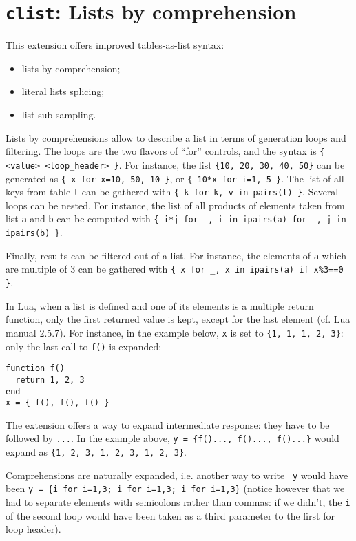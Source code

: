 \section{{\tt clist}: Lists by comprehension} 

This extension offers improved tables-as-list syntax:
\begin{itemize}
\item lists by comprehension;
\item literal lists splicing;
\item list sub-sampling.
\end{itemize}

Lists by comprehensions allow to describe a list in terms of
generation loops and filtering. The loops are the two flavors of
``for'' controls, and the syntax is {\tt\{ <value> <loop\_header>
  \}}. For instance, the list {\tt\{10, 20, 30, 40, 50\}} can be generated
as {\tt\{ x for x=10, 50, 10 \}}, or {\tt\{ 10*x for i=1, 5 \}}. The
list of all keys from table {\tt t} can be gathered with {\tt\{ k for
  k, v in pairs(t) \}}. Several loops can be nested. For instance, the
list of all products of elements taken from list {\tt a} and {\tt b}
can be computed with {\tt\{ i*j for \_, i in ipairs(a) for \_, j in
  ipairs(b) \}}.

Finally, results can be filtered out of a list. For instance, the
elements of {\tt a} which are multiple of 3 can be gathered with
{\tt\{ x for \_, x in ipairs(a) if x\%3==0 \}}.

In Lua, when a list is defined and one of its elements is a multiple
return function, only the first returned value is kept, except for the
last element (cf. Lua manual 2.5.7). For instance, in the example
below, {\tt x} is set to {\tt\{1, 1, 1, 2, 3\}}: only the last call to
{\tt f()} is expanded:

\begin{verbatim}
function f()
  return 1, 2, 3
end
x = { f(), f(), f() }
\end{verbatim}

The extension offers a way to expand intermediate response: they have
to be followed by {\tt...}. In the example above, {\tt y = \{f()...,
  f()..., f()...\}} would expand as {\tt\{1, 2, 3, 1, 2, 3, 1, 2,
  3\}}.

Comprehensions are naturally expanded, i.e. another way to write {\tt
  y} would have been {\tt y = \{i for i=1,3; i for i=1,3; i for
  i=1,3\}} (notice however that we had to separate elements with
semicolons rather than commas: if we didn't, the {\tt i} of the second
loop would have been taken as a third parameter to the first for loop
header).

